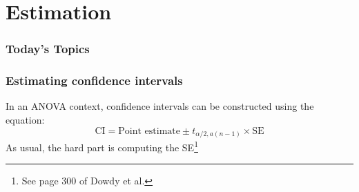 \documentclass[color=usenames,dvipsnames]{beamer}\usepackage[]{graphicx}\usepackage[]{color}
\begin{document}






\section{Estimation}



\begin{frame}[plain]
  \frametitle{Today's Topics}
  \Large
  \tableofcontents[currentsection]
\end{frame}






\begin{frame}[fragile]
  \frametitle{Estimating confidence intervals}
  In an ANOVA context, confidence intervals can be
  constructed using the equation:
  \[
    \text{CI} = \text{Point estimate} \pm t_{\alpha/2,a(n-1)} \times \text{SE}
  \]
  As usual, the hard part is computing the SE\footnote{See page 300 of Dowdy et al.}
\end{frame}





\end{document}
